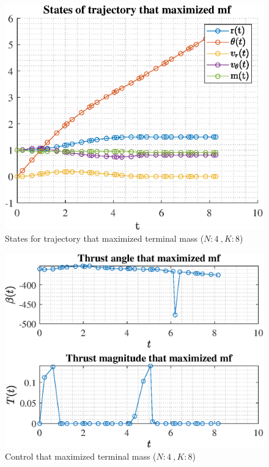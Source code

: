 \documentclass[]{article}
\begin{document}
	\begin{figure}
		\centering
		\includegraphics[scale=0.75]{states_N4_K8_C2_mf.eps}
		\caption{States for trajectory that maximized terminal mass (\(N:4\ , K:8\))}
		\label{fig:states_N4_K8_C2_mf}
	\end{figure}
	\begin{figure}
		\centering
		\includegraphics[scale=0.75]{control_N4_K8_C2_mf.eps}
		\caption{Control that maximized terminal mass (\(N:4\ , K:8\))}
		\label{fig:control_N4_K8_C2_mf}
	\end{figure}
\end{document}
